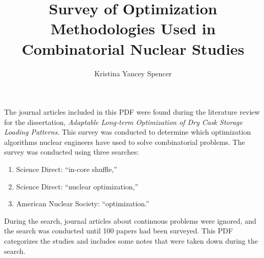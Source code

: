 \documentclass[12pt]{article}
\author{Kristina Yancey Spencer}
\title{Survey of Optimization Methodologies Used in Combinatorial Nuclear Studies}
\date{\displaydate{date}}
\begin{document}
\maketitle

The journal articles included in this PDF were found during the literature review for the dissertation, \textit{Adaptable Long-term Optimization of Dry Cask Storage Loading Patterns}. This survey was conducted to determine which optimization algorithms nuclear engineers have used to solve combinatorial problems. The survey was conducted using three searches:
\begin{enumerate}
	\item Science Direct: ``in-core shuffle,'' 
	\item Science Direct: ``nuclear optimization,''
	\item American Nuclear Society: ``optimization.''
\end{enumerate}
During the search, journal articles about continuous problems were ignored, and the search was conducted until 100 papers had been surveyed. This PDF categorizes the studies and includes some notes that were taken down during the search.
\end{document}
